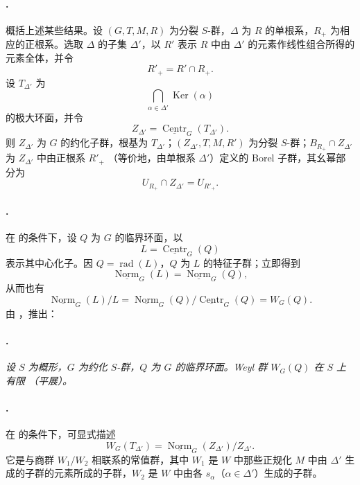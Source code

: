 \paragraph{.}
概括上述某些结果。设 \((G,T,M,R)\) 为分裂 \(S\)-群，\(\Delta\) 为 \(R\) 的单根系，\(R_+\) 为相应的正根系。选取 \(\Delta\) 的子集 \(\Delta'\)，以 \(R'\) 表示 \(R\) 中由 \(\Delta'\) 的元素作线性组合所得的元素全体，并令
\[
  R'_+=R'\cap R_+.
\]
设 \(T_{\Delta'}\) 为
\[
  \bigcap_{\alpha\in\Delta'}\operatorname{Ker}(\alpha)
\]
的极大环面，并令
\[
  Z_{\Delta'}
  =
  \underline{\operatorname{Centr}}_G(T_{\Delta'}).
\]
则 \(Z_{\Delta'}\) 为 \(G\) 的约化子群，根基为 \(T_{\Delta'}\)；\((Z_{\Delta'},T,M,R')\) 为分裂 \(S\)-群；\(B_{R_+}\cap Z_{\Delta'}\) 为 \(Z_{\Delta'}\) 中由正根系 \(R'_+\) \textup{（等价地，由单根系 \(\Delta'\)）}定义的 Borel 子群，其幺幂部分为
\[
  U_{R_+}\cap Z_{\Delta'}=U_{R'_+}.
\]

\paragraph{.}
在  的条件下，设 \(Q\) 为 \(G\) 的临界环面，以
\[
  L=\underline{\operatorname{Centr}}_G(Q)
\]
表示其中心化子。因 \(Q=\operatorname{rad}(L)\)，\(Q\) 为 \(L\) 的特征子群；立即得到
\[
  \underline{\operatorname{Norm}}_G(L)
  =
  \underline{\operatorname{Norm}}_G(Q),
\]
从而也有
\[
  \underline{\operatorname{Norm}}_G(L)/L
  =
  \underline{\operatorname{Norm}}_G(Q)/
  \underline{\operatorname{Centr}}_G(Q)
  =
  W_G(Q).
\]
由 ，推出：

\paragraph{.}
{\itshape 设 \(S\) 为概形，\(G\) 为约化 \(S\)-群，\(Q\) 为 \(G\) 的临界环面。Weyl 群 \(W_G(Q)\) 在 \(S\) 上有限 \textup{（平展）}。}

\paragraph{.}
在  的条件下，可显式描述
\[
  W_G(T_{\Delta'})
  =
  \underline{\operatorname{Norm}}_G(Z_{\Delta'})/Z_{\Delta'}.
\]
它是与商群 \(W_1/W_2\) 相联系的常值群，其中 \(W_1\) 是 \(W\) 中那些正规化 \(M\) 中由 \(\Delta'\) 生成的子群的元素所成的子群，\(W_2\) 是 \(W\) 中由各 \(s_\alpha\)（\(\alpha\in\Delta'\)）生成的子群。

